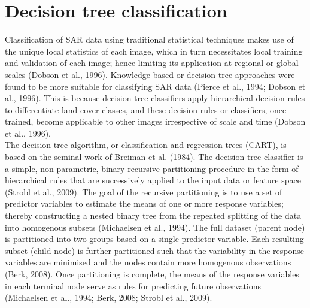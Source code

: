 \section{Decision tree classification}
\label{sec: litrev-decision-tree}

Classification of SAR data using traditional statistical techniques makes use of the unique local statistics of each image, which in turn necessitates local training and validation of each image; hence limiting its application at regional or global scales (Dobson et al., 1996). Knowledge-based or decision tree approaches were found to be more suitable for classifying SAR data (Pierce et al., 1994; Dobson et al., 1996). This is because decision tree classifiers apply hierarchical decision rules to differentiate land cover classes, and these decision rules or classifiers, once trained, become applicable to other images irrespective of scale and time (Dobson et al., 1996).\\

The decision tree algorithm, or classification and regression trees (CART), is based on the seminal work of Breiman et al. (1984). The decision tree classifier is a simple, non-parametric, binary recursive partitioning procedure in the form of hierarchical rules that are successively applied to the input data or feature space (Strobl et al., 2009). The goal of the recursive partitioning is to use a set of predictor variables to estimate the means of one or more response variables; thereby constructing a nested binary tree from the repeated splitting of the data into homogenous subsets (Michaelsen et al., 1994). The full dataset (parent node) is partitioned into two groups based on a single predictor variable. Each resulting subset (child node) is further partitioned such that the variability in the response variables are minimised and the nodes contain more homogenous observations (Berk, 2008). Once partitioning is complete, the means of the response variables in each terminal node serve as rules for predicting future observations (Michaelsen et al., 1994; Berk, 2008; Strobl et al., 2009).

